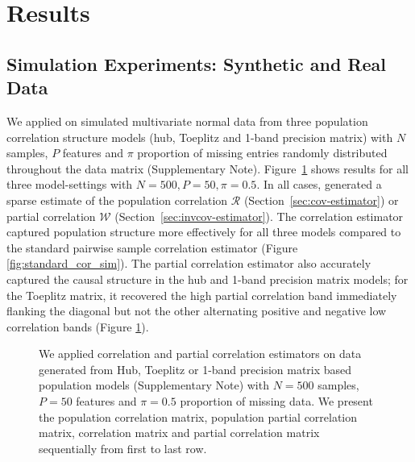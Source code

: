 \section{Results}\label{sec:results}

\subsection*{Simulation Experiments: Synthetic and Real Data}

We applied \Robocov{} on simulated multivariate normal data from three population correlation structure models (hub, Toeplitz and 1-band precision matrix) with $N$ samples, $P$ features and $\pi$ proportion of missing entries randomly distributed throughout the data matrix (Supplementary Note). Figure~\ref{fig:sim_results} shows results for all three model-settings with $N = 500, P = 50, \pi = 0.5$. In all cases, \Robocov{} generated a sparse estimate of the population correlation $\mathcal{R}$ (Section~\ref{sec:cov-estimator}) or partial correlation $\mathcal{W}$ (Section~\ref{sec:invcov-estimator}). The \Robocov{} correlation estimator captured population structure more effectively for all three models compared to the standard pairwise sample correlation estimator (Figure \ref{fig:standard_cor_sim}). The \Robocov{} partial correlation estimator also accurately captured the causal structure in the hub and 1-band precision matrix models; for the Toeplitz matrix, it recovered the high partial correlation band immediately flanking the diagonal but not the other alternating positive and negative low correlation bands (Figure \ref{fig:sim_results}). 

\begin{figure}[!tpb]
\centering
{}
\caption{We applied \Robocov{} correlation and partial correlation estimators on data generated from Hub, Toeplitz or 1-band precision matrix based population models (Supplementary Note) with $N=500$ samples, $P=50$ features and $\pi=0.5$ proportion of missing data. We present the population correlation matrix, population partial correlation matrix, \Robocov{} correlation matrix and \Robocov{} partial correlation matrix sequentially from first to last row.}
\label{fig:sim_results}
\end{figure}

